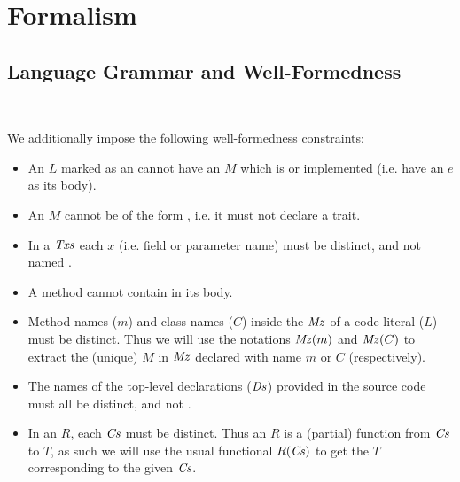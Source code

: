\section{Formalism}
\subsection{Language Grammar and Well-Formedness}
\newcommand{\foo}[1]{\ensuremath{#1 \atop \mathit{#1}}}
\noindent


\noindent
\newlength{\gramwidth}
\setlength{\gramwidth}{\dimexpr\textwidth-1em}
\begin{minipage}[t]{0.6\gramwidth}
\begin{grammar}
\end{grammar}
\end{minipage}\hfil
\begin{minipage}[t]{0.4\gramwidth}
\begin{grammar}
	\\
\end{grammar}
\end{minipage}

We additionally impose the following well-formedness constraints:
\begin{itemize}
	\item An $L$ marked as an \interface cannot have an $M$ which is \static or implemented (i.e. have an $e$ as its body).
	\item An $M$ cannot be of the form , i.e. it must not declare a trait.
	\item In a $\mathit{Txs}$ each $x$ (i.e. field or parameter name) must be distinct, and not named \this. 
	\item A \static method cannot contain \this in its body.
	\item Method names ($m$) and class names ($C$) inside the $\mathit{Mz}$ of a code-literal ($L$) must be distinct. Thus we will use the notations $\mathit{Mz}(m)$ and $\mathit{Mz}(C)$ to extract the (unique) $M$ in $\mathit{Mz}$ declared with name $m$ or $C$ (respectively).
	
	\item The names of the top-level declarations ($\mathit{Ds}$) provided in the source code must all be distinct, and not \This.
	\item In an $R$, each $\mathit{Cs}$ must be distinct. Thus an $R$ is a (partial) function from $\mathit{Cs}$ to $T$, as such we will use the usual functional $R(\mathit{Cs})$ to get the $T$ corresponding to the given $\mathit{Cs}$.
\end{itemize}



